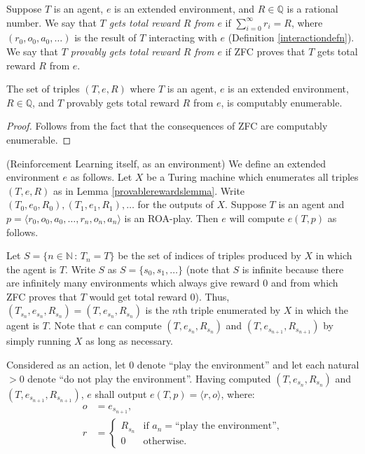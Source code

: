 \documentclass[runningheads]{llncs}
\begin{document}
\begin{definition}
    Suppose $T$ is an agent, $e$ is an extended environment, and $R\in\mathbb Q$ is
    a rational number. We say that \emph{$T$ gets total reward $R$ from $e$} if
    $\sum_{i=0}^{\infty} r_i = R$, where $(r_0,o_0,a_0,\ldots)$ is the result of
    $T$ interacting with $e$ (Definition \ref{interactiondefn}).
    We say that \emph{$T$ provably gets total reward $R$ from $e$} if
    ZFC proves that $T$ gets total reward $R$ from $e$.
\end{definition}

\begin{lemma}
\label{provablerewardslemma}
    The set of triples $(T,e,R)$ where $T$ is an agent, $e$ is an extended environment,
    $R\in\mathbb Q$, and $T$ provably gets total reward $R$ from $e$, is computably enumerable.
\end{lemma}

\begin{proof}
    Follows from the fact that the consequences of ZFC are computably enumerable.
\end{proof}

\begin{example}
\label{metaexample}
    (Reinforcement Learning itself, as an environment)
    We define an extended environment $e$ as follows.
    Let $X$ be a Turing machine which enumerates all triples
    $(T,e,R)$ as in Lemma \ref{provablerewardslemma}.
    Write $(T_0,e_0,R_0),(T_1,e_1,R_1),\ldots$ for the outputs of $X$.
    Suppose $T$ is an agent and $p=\langle r_0,o_0,a_0,\ldots,r_n,o_n,a_n\rangle$
    is an ROA-play.
    Then $e$ will compute $e(T,p)$ as follows.

    Let $S=\{n\in\mathbb N\,:\,T_n=T\}$ be the set of indices of
    triples produced by $X$ in which the agent is $T$.
    Write $S$ as $S=\{s_0,s_1,\ldots\}$ (note that $S$ is infinite because
    there are infinitely many environments which always give reward $0$ and from which
    ZFC proves that $T$ would get total reward $0$).
    Thus, $(T_{s_n},e_{s_n},R_{s_n})=(T,e_{s_n},R_{s_n})$ is the $n$th triple enumerated
    by $X$ in which the agent is $T$. Note that $e$ can compute $(T,e_{s_n},R_{s_n})$
    and $(T,e_{s_{n+1}},R_{s_{n+1}})$ by
    simply running $X$ as long as necessary.

    Considered as an action, let $0$ denote ``play the environment''
    and let each natural $>0$ denote ``do not play the environment''.
    Having computed $(T,e_{s_n},R_{s_n})$ and $(T,e_{s_{n+1}},R_{s_{n+1}})$,
    $e$ shall output $e(T,p)=\langle r,o\rangle$, where:
    \begin{align*}
        o &= e_{s_{n+1}},\\
        r &=
        \begin{cases}
            R_{s_n} &\mbox{if $a_n=\mbox{``play the environment''}$,}\\
            0 &\mbox{otherwise.}
        \end{cases}
    \end{align*}
\end{example}
\end{document}
